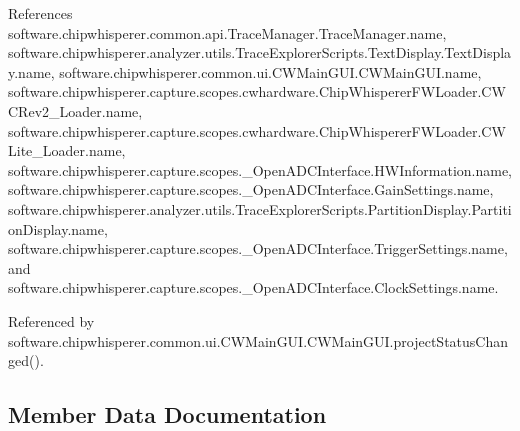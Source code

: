 References software.\+chipwhisperer.\+common.\+api.\+Trace\+Manager.\+Trace\+Manager.\+name, software.\+chipwhisperer.\+analyzer.\+utils.\+Trace\+Explorer\+Scripts.\+Text\+Display.\+Text\+Display.\+name, software.\+chipwhisperer.\+common.\+ui.\+C\+W\+Main\+G\+U\+I.\+C\+W\+Main\+G\+U\+I.\+name, software.\+chipwhisperer.\+capture.\+scopes.\+cwhardware.\+Chip\+Whisperer\+F\+W\+Loader.\+C\+W\+C\+Rev2\+\_\+\+Loader.\+name, software.\+chipwhisperer.\+capture.\+scopes.\+cwhardware.\+Chip\+Whisperer\+F\+W\+Loader.\+C\+W\+Lite\+\_\+\+Loader.\+name, software.\+chipwhisperer.\+capture.\+scopes.\+\_\+\+Open\+A\+D\+C\+Interface.\+H\+W\+Information.\+name, software.\+chipwhisperer.\+capture.\+scopes.\+\_\+\+Open\+A\+D\+C\+Interface.\+Gain\+Settings.\+name, software.\+chipwhisperer.\+analyzer.\+utils.\+Trace\+Explorer\+Scripts.\+Partition\+Display.\+Partition\+Display.\+name, software.\+chipwhisperer.\+capture.\+scopes.\+\_\+\+Open\+A\+D\+C\+Interface.\+Trigger\+Settings.\+name, and software.\+chipwhisperer.\+capture.\+scopes.\+\_\+\+Open\+A\+D\+C\+Interface.\+Clock\+Settings.\+name.



Referenced by software.\+chipwhisperer.\+common.\+ui.\+C\+W\+Main\+G\+U\+I.\+C\+W\+Main\+G\+U\+I.\+project\+Status\+Changed().




\subsection{Member Data Documentation}
\hypertarget{classsoftware_1_1chipwhisperer_1_1common_1_1ui_1_1CWMainGUI_1_1CWMainGUI_aa5ab4796edad68755b7a4604bd3d510e}{}
